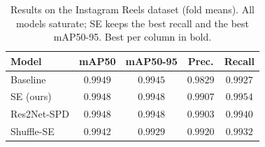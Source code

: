 \begin{table}[t]
\caption{Results on the Instagram Reels dataset (fold means). All models saturate; SE keeps the best recall and the best mAP50-95. Best per column in bold.}
\label{tab:judi3k}
\centering
\footnotesize
\renewcommand{\arraystretch}{1.3}
\setlength{\tabcolsep}{5pt}
\begin{tabular}{@{}lcccc@{}}
\toprule
\textbf{Model} & \textbf{mAP50} & \textbf{mAP50-95} & \textbf{Prec.} & \textbf{Recall} \\
\midrule
Baseline      & $\mathbf{0.9949}$ & $0.9945$ & $0.9829$ & $0.9927$ \\
SE (ours)     & $0.9948$ & $\mathbf{0.9948}$ & $0.9907$ & $\mathbf{0.9954}$ \\
Res2Net-SPD   & $0.9948$ & $\mathbf{0.9948}$ & $0.9903$ & $0.9940$ \\
Shuffle-SE    & $0.9942$ & $0.9929$ & $\mathbf{0.9920}$ & $0.9932$ \\
\bottomrule
\end{tabular}
\end{table}
